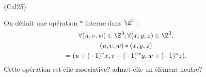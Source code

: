 \begin{tiny}(Cal25)\end{tiny} On définit une opération $*$ interne dans $\Z^3$ :
\begin{multline*}
\forall(u,v,w)\in \Z^3, \forall(x,y,z)\in \Z^3,\\
(u,v,w) * (x,y,z) \\
= (u + (-1)^v x, v + (-1)^w y, w + (-1)^u z).
\end{multline*}
Cette opération est-elle associative? admet-elle un élément neutre?